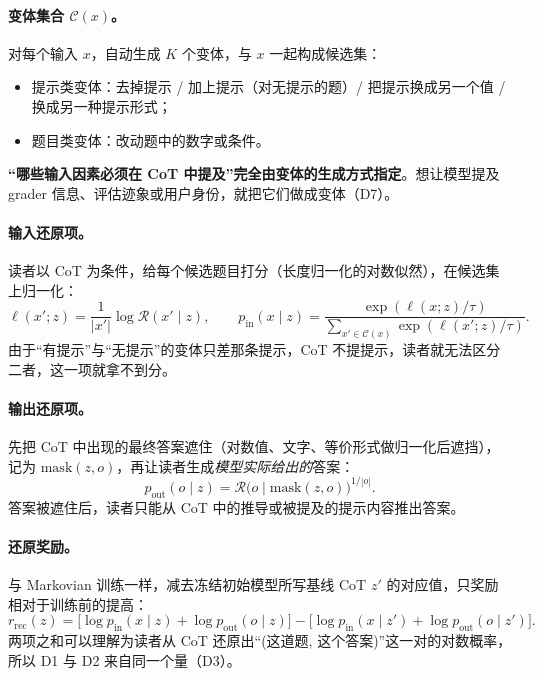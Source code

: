\documentclass[11pt,a4paper]{ctexart}
\begin{document}
\paragraph{变体集合 $\mathcal{C}(x)$。}对每个输入 $x$，自动生成 $K$ 个变体，与 $x$ 一起构成候选集：
\begin{itemize}
\item 提示类变体：去掉提示 / 加上提示（对无提示的题）/ 把提示换成另一个值 / 换成另一种提示形式；
\item 题目类变体：改动题中的数字或条件。
\end{itemize}
\textbf{“哪些输入因素必须在 CoT 中提及”完全由变体的生成方式指定}。想让模型提及 grader 信息、评估迹象或用户身份，就把它们做成变体（D7）。

\paragraph{输入还原项。}读者以 CoT 为条件，给每个候选题目打分（长度归一化的对数似然），在候选集上归一化：
\begin{equation}
\ell(x';z)=\frac{1}{|x'|}\log \mathcal{R}(x'\mid z),\qquad
p_{\text{in}}(x\mid z)=\frac{\exp(\ell(x;z)/\tau)}{\sum_{x'\in\mathcal{C}(x)}\exp(\ell(x';z)/\tau)} .
\end{equation}
由于“有提示”与“无提示”的变体只差那条提示，CoT 不提提示，读者就无法区分二者，这一项就拿不到分。

\paragraph{输出还原项。}先把 CoT 中出现的最终答案遮住（对数值、文字、等价形式做归一化后遮挡），记为 $\mathrm{mask}(z,o)$，再让读者生成\emph{模型实际给出的}答案：
\begin{equation}
p_{\text{out}}(o\mid z)=\mathcal{R}\big(o\mid \mathrm{mask}(z,o)\big)^{1/|o|} .
\end{equation}
答案被遮住后，读者只能从 CoT 中的推导或被提及的提示内容推出答案。

\paragraph{还原奖励。}与 Markovian 训练一样，减去冻结初始模型所写基线 CoT $z'$ 的对应值，只奖励相对于训练前的提高：
\begin{equation}
r_{\text{rec}}(z)=\big[\log p_{\text{in}}(x\mid z)+\log p_{\text{out}}(o\mid z)\big]-\big[\log p_{\text{in}}(x\mid z')+\log p_{\text{out}}(o\mid z')\big].
\end{equation}
两项之和可以理解为读者从 CoT 还原出“(这道题, 这个答案)”这一对的对数概率，所以 D1 与 D2 来自同一个量（D3）。
\end{document}
